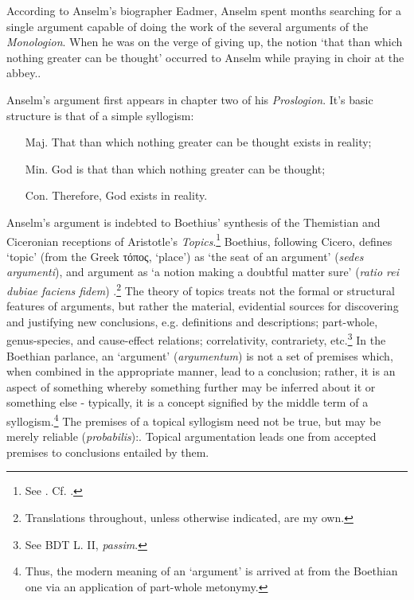 \documentclass[]{amsart}
\begin{document}
According to Anselm's biographer Eadmer, Anselm spent months searching for a single argument capable of doing the work of the several arguments of the \textit{Monologion}. When he was on the verge of giving up, the notion `that than which nothing greater can be thought' occurred to Anselm while praying in choir at the abbey.\cite[VA 1, 3, 26]{VA}.

Anselm's argument first appears in chapter two of his \textit{Proslogion}. It's basic structure is that of a simple syllogism:
\begin{enumerate}
\item[Maj.] That than which nothing greater can be thought exists in reality;
\item[Min.] God is that than which nothing greater can be thought;
\item[Con.] Therefore, God exists in reality.
\end{enumerate}

Anselm's argument is indebted to Boethius' synthesis of the Themistian and Ciceronian receptions of Aristotle's \textit{Topics}.\footnote{See \cite{Holopainen2007,Archambault2017}. Cf. \cite{Henry1974,Cerezo2015}.} Boethius, following Cicero, defines `topic' (from the Greek τόπος,  `place') as `the seat of an argument' (\textit{sedes argumenti}), and argument as `a notion making a doubtful matter sure' (\textit{ratio rei dubiae faciens fidem}) \cite[BDT 1174C, 1185A]{BDT} \cite[BTC 1048A]{BTC}.\footnote{Translations throughout, unless otherwise indicated, are my own.} The theory of topics treats not the formal or structural features of arguments, but rather the material, evidential sources for discovering and justifying new conclusions, e.g. definitions and descriptions; part-whole, genus-species, and cause-effect relations; correlativity, contrariety, etc.\footnote{See BDT L. II, \textit{passim}.} In the Boethian parlance, an `argument' (\textit{argumentum}) is not a set of premises which, when combined in the appropriate manner, lead to a conclusion; rather, it is an aspect of something whereby something further may be inferred about it or something else - typically, it is a concept signified by the middle term of a syllogism.\footnote{Thus, the modern meaning of an `argument' is arrived at from the Boethian one via an application of part-whole metonymy.} The premises of a topical syllogism need not be true, but may be merely reliable (\textit{probabilis}):\cite[BDT 1180C-82C]{BDT}. Topical argumentation leads one from accepted premises to conclusions entailed by them. 
\end{document}
